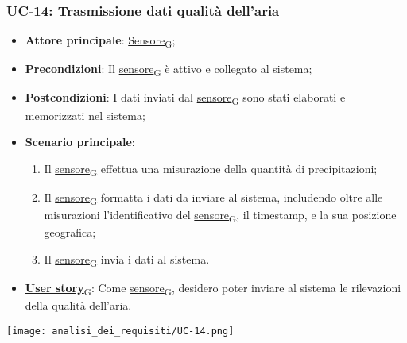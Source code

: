 \subsubsection{UC-14: Trasmissione dati qualità dell'aria}
\begin{itemize}
	\item \textbf{Attore principale}: \href{https://7last.github.io/docs/rtb/documentazione-interna/glossario\#sensore}{Sensore\textsubscript{G}};
	\item \textbf{Precondizioni}: Il \href{https://7last.github.io/docs/rtb/documentazione-interna/glossario\#sensore}{sensore\textsubscript{G}} è attivo e collegato al sistema;
	\item \textbf{Postcondizioni}: I dati inviati dal \href{https://7last.github.io/docs/rtb/documentazione-interna/glossario\#sensore}{sensore\textsubscript{G}} sono stati elaborati e memorizzati nel sistema;
	\item \textbf{Scenario principale}:
	      \begin{enumerate}
		      \item Il \href{https://7last.github.io/docs/rtb/documentazione-interna/glossario\#sensore}{sensore\textsubscript{G}} effettua una misurazione della quantità di precipitazioni;
		      \item Il \href{https://7last.github.io/docs/rtb/documentazione-interna/glossario\#sensore}{sensore\textsubscript{G}} formatta i dati da inviare al sistema, includendo oltre alle misurazioni l'identificativo del \href{https://7last.github.io/docs/rtb/documentazione-interna/glossario\#sensore}{sensore\textsubscript{G}},
		            il timestamp, e la sua posizione geografica;
		      \item Il \href{https://7last.github.io/docs/rtb/documentazione-interna/glossario\#sensore}{sensore\textsubscript{G}} invia i dati al sistema.
	      \end{enumerate}
	\item \href{https://7last.github.io/docs/rtb/documentazione-interna/glossario\#user-story}{\textbf{User story}\textsubscript{G}}:
	      Come \href{https://7last.github.io/docs/rtb/documentazione-interna/glossario\#sensore}{sensore\textsubscript{G}}, desidero poter inviare al sistema le rilevazioni della qualità dell'aria.
\end{itemize}

\begin{center}
	\texttt{[image: analisi\_dei\_requisiti/UC-14.png]}
\end{center}

